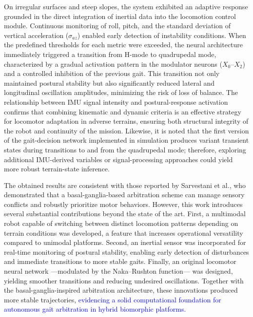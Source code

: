 \documentclass[preprint,12pt]{elsarticle}
\newcommand{\revblue}[1]{\textcolor{blue}{#1}}
\begin{document}
On irregular surfaces and steep slopes, the system exhibited an adaptive response grounded in the direct integration of inertial data into the locomotion control module. Continuous monitoring of roll, pitch, and the standard deviation of vertical acceleration ($\sigma_{az}$) enabled early detection of instability conditions. When the predefined thresholds for each metric were exceeded, the neural architecture immediately triggered a transition from H-mode to quadrupedal mode, characterized by a gradual activation pattern in the modulator neurons ($X_{0}$–$X_{2}$) and a controlled inhibition of the previous gait. This transition not only maintained postural stability but also significantly reduced lateral and longitudinal oscillation amplitudes, minimizing the risk of loss of balance. The relationship between IMU signal intensity and postural-response activation confirms that combining kinematic and dynamic criteria is an effective strategy for locomotor adaptation in adverse terrains, ensuring both structural integrity of the robot and continuity of the mission. Likewise, it is noted that the first version of the gait-decision network implemented in simulation produces variant transient states during transitions to and from the quadrupedal mode; therefore, exploring additional IMU-derived variables or signal-processing approaches could yield more robust terrain-state inference. 

The obtained results are consistent with those reported by Sarvestani et al., who demonstrated that a basal-ganglia-based arbitration scheme can manage sensory conflicts and robustly prioritize motor behaviors. However, this work introduces several substantial contributions beyond the state of the art. First, a multimodal robot capable of switching between distinct locomotion patterns depending on terrain conditions was developed, a feature that increases operational versatility compared to unimodal platforms. Second, an inertial sensor was incorporated for real-time monitoring of postural stability, enabling early detection of disturbances and immediate transitions to more stable gaits. Finally, an original locomotor neural network ---modulated by the Naka–Rushton function--- was designed, yielding smoother transitions and reducing undesired oscillations. Together with the basal-ganglia-inspired arbitration architecture, these innovations produced more stable trajectories, \revblue{evidencing a solid computational foundation for autonomous gait arbitration in hybrid biomorphic platforms.} 
\end{document}
